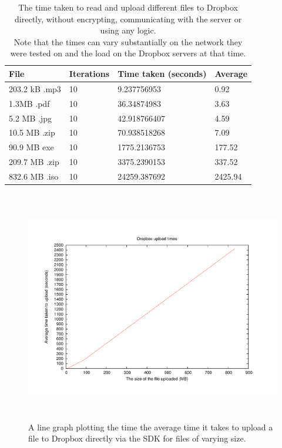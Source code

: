 \documentclass[12pt, titlepage]{article}
\begin{document}
\begin{table}[H]
\begin{center}
    \begin{tabular}{ | l | l | l | l |}
    \hline
    \textbf{File} & \textbf{Iterations} & \textbf{Time taken (seconds)} & \textbf{Average} \\ \hline
    203.2 kB .mp3 & 10 & 9.237756953 & 0.92 \\ \hline
    1.3MB .pdf & 10 & 36.34874983 & 3.63 \\ \hline
	5.2 MB .jpg & 10 & 42.918766407 & 4.59 \\ \hline
    10.5 MB .zip & 10 & 70.938518268 & 7.09 \\ \hline
    90.9 MB exe & 10 & 1775.2136753  & 177.52 \\ \hline
    209.7 MB .zip & 10 & 3375.2390153 & 337.52 \\ \hline
    832.6 MB .iso & 10 & 24259.387692 & 2425.94 \\ \hline
    \end{tabular}
    \caption{The time taken to read and upload different files to Dropbox directly, without encrypting, communicating with the server or using any logic. \\ Note that the times can vary substantially on the network they were tested on and the load on the Dropbox servers at that time.} \label{tab:uploadDropboxBenchmark}
    \end{center}
\end{table}


\begin{figure}[H]
\centerline{\includegraphics[height=4.0in,width=7in,angle=0]{plots/dropboxUpload/dropboxUploadTimes.pdf}}
\caption{A line graph plotting the time the average time it takes to upload a file to Dropbox directly via the SDK for files of varying size.}
\label{fig:dropboxUploadLineGraph}
\end{figure}
\end{document}

